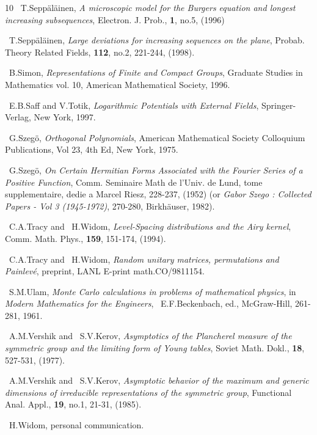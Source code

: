 \documentclass{amsart}
\theoremstyle{definition}
\theoremstyle{remark}
\numberwithin{equation}{section}
\begin{document}
\begin{thebibliography}{10}
~T.Sepp\"al\"ainen, \emph{A microscopic model for the
Burgers equation and longest increasing subsequences},
Electron. J. Prob., \textbf{1}, no.5, (1996)

~T.Sepp\"al\"ainen, \emph{Large deviations for increasing sequences 
on the plane}, Probab. Theory Related Fields, \textbf{112}, 
no.2, 221-244, (1998).

~B.Simon, \emph{Representations of Finite and Compact Groups},
Graduate Studies in Mathematics vol. 10, American Mathematical Society,
1996.

~E.B.Saff and V.Totik, \emph{Logarithmic Potentials with External 
Fields}, Springer-Verlag, New York, 1997.

~G.Szeg\"o, \emph{Orthogonal Polynomials}, American Mathematical 
Society Colloquium Publications, Vol 23, 4th Ed, New York, 1975.

~G.Szeg\"o, \emph{On Certain Hermitian Forms Associated with the 
Fourier Series of a Positive Function}, Comm. Seminaire Math de 
l'Univ. de Lund, tome supplementaire, dedie a Marcel Riesz, 
228-237, (1952) (or \emph{Gabor Szego : Collected Papers - Vol 3 
(1945-1972)}, 270-280, Birkh\"auser, 1982).

~C.A.Tracy and ~H.Widom, \emph{Level-Spacing distributions
and the Airy kernel}, Comm. Math. Phys., \textbf{159}, 151-174, (1994).

~C.A.Tracy and ~H.Widom, \emph{Random unitary matrices, permutations 
and Painlev\'e}, preprint, LANL E-print math.CO/9811154.

~S.M.Ulam, \emph{Monte Carlo calculations in problems of 
mathematical physics}, in \emph{Modern Mathematics for the Engineers}, 
~E.F.Beckenbach, ed., McGraw-Hill, 261-281, 1961.

~A.M.Vershik and ~S.V.Kerov, \emph{Asymptotics of the Plancherel
measure of the symmetric group and the limiting form of Young tables},
Soviet Math. Dokl., \textbf{18}, 527-531, (1977).

~A.M.Vershik and ~S.V.Kerov, \emph{Asymptotic behavior of the maximum 
and generic dimensions of irreducible representations of the symmetric 
group},
Functional Anal. Appl., \textbf{19}, no.1, 21-31, (1985).

~H.Widom, personal communication.

\end{thebibliography}
\end{document}
